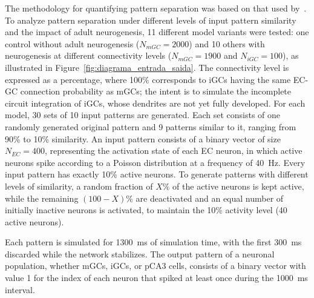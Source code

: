 The methodology for quantifying pattern separation was based on that used by~\textcite{kimEffect2024}. To analyze pattern
separation under different levels of input pattern similarity and the impact of adult neurogenesis, 11 different model variants
were tested: one control without adult neurogenesis ($N_{mGC} = 2000$) and 10 others with neurogenesis at different
connectivity levels ($N_{mGC} = 1900$ and $N_{iGC} = 100$), as illustrated in Figure~\ref{fig:diagrama_entrada_saida}. The
connectivity level is expressed as a percentage, where 100\% corresponds to iGCs having the same EC-GC connection probability
as mGCs; the intent is to simulate the incomplete circuit integration of iGCs, whose dendrites are not yet fully developed. For
each model, 30 sets of 10 input patterns are generated. Each set consists of one randomly generated original pattern and 9
patterns similar to it, ranging from 90\% to 10\% similarity. An input pattern consists of a binary vector of size
$N_{EC} = 400$, representing the activation state of each EC neuron, in which active neurons spike according to a Poisson
distribution at a frequency of \SI{40}{\hertz}. Every input pattern has exactly 10\% active neurons. To generate patterns with
different levels of similarity, a random fraction of $X\%$ of the active neurons is kept active, while the remaining
$(100 - X)\%$ are deactivated and an equal number of initially inactive neurons is activated, to maintain the 10\% activity
level (40 active neurons).

Each pattern is simulated for \SI{1300}{\milli\second} of simulation time, with the first \SI{300}{\milli\second} discarded
while the network stabilizes. The output pattern of a neuronal population, whether mGCs, iGCs, or pCA3 cells, consists of a
binary vector with value 1 for the index of each neuron that spiked at least once during the \SI{1000}{\milli\second} interval.

